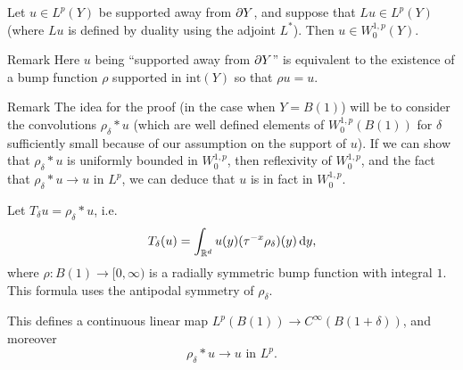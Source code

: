 \documentclass{amsart}
\begin{document}
\begin{thm}
  Let $u\in L^{p}(Y)$ be supported away from $\partial Y$, and suppose that
  $Lu\in L^{p}(Y)$ (where $Lu$ is defined by duality using the adjoint
  $L^{*}$). Then $u\in W^{1,p}_{0}(Y)$. 
\end{thm}
\begin{clear}{Remark}
  Here $u$ being ``supported away from $\partial Y$'' is equivalent to the existence
  of a bump function $\rho$ supported in $\text{int}(Y)$ so that $\rho
  u=u$.
\end{clear}
\begin{clear}{Remark}
  The idea for the proof (in the case when $Y=B(1)$) will be to consider the convolutions
  $\rho_{\delta}\ast u$ (which are well defined elements of
  $W^{1,p}_{0}(B(1))$ for $\delta$ sufficiently small because of our
  assumption on the support of $u$). If we can show that
  $\rho_{\delta}\ast u$ is uniformly bounded in $W^{1,p}_{0}$, then
  reflexivity of $W^{1,p}_{0}$, and the fact that $\rho_{\delta}\ast
  u\to u$ in $L^{p}$, we can deduce that $u$ is in fact in
  $W^{1,p}_{0}$.
\end{clear}
\begin{defn}
  Let $T_{\delta}u=\rho_{\delta}\ast u$, i.e.
  \begin{equation*}
    T_{\delta}(u)=\int_{\mathbb{R}^{d}} u(y)(\tau^{-x}\rho_{\delta})(y)\,\mathrm{d} y,
  \end{equation*}
  where $\rho:B(1)\to [0,\infty)$ is a radially symmetric bump
  function with integral $1$. This formula uses the antipodal symmetry of
  $\rho_{\delta}$.

  This defines a continuous linear
  map $L^{p}(B(1))\to C^{\infty}(B(1+\delta))$, and moreover
  \begin{equation*}
    \rho_{\delta}\ast u\to u\text{ in $L^{p}$}.
  \end{equation*}
\end{defn}
\end{document}
